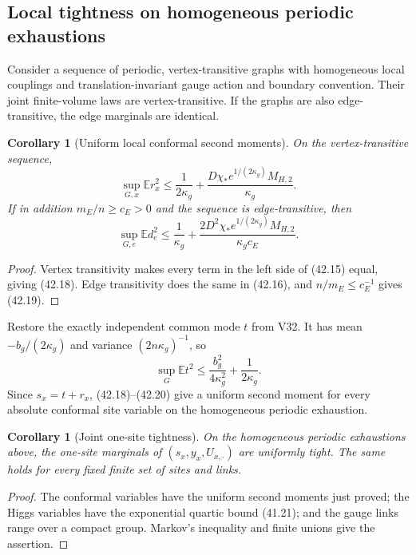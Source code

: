 \documentclass[11pt]{article}
\newtheorem{corollary}[theorem]{Corollary}
\theoremstyle{remark}
\begin{document}
\subsection{Local tightness on homogeneous periodic exhaustions}

Consider a sequence of periodic, vertex-transitive graphs with
homogeneous local couplings and translation-invariant gauge action and
boundary convention.  Their joint finite-volume laws are
vertex-transitive.  If the graphs are also edge-transitive, the edge
marginals are identical.

\begin{corollary}[Uniform local conformal second moments]
\label{cor:v17v42-local}
On the vertex-transitive sequence,
\[
 \sup_{G,x}\mathbb E r_x^2
 \leq\frac1{2\kappa_g}
 +\frac{D\chi_*e^{1/(2\kappa_g)}M_{H,2}}{\kappa_g}.              \tag{42.18}
\]
If in addition \(m_E/n\geq c_E>0\) and the sequence is edge-transitive,
then
\[
 \sup_{G,e}\mathbb E d_e^2
 \leq\frac1{\kappa_g}
 +\frac{2D^2\chi_*e^{1/(2\kappa_g)}M_{H,2}}
 {\kappa_gc_E}.                                   \tag{42.19}
\]
\end{corollary}

\begin{proof}
Vertex transitivity makes every term in the left side of (42.15)
equal, giving (42.18).  Edge transitivity does the same in (42.16), and
\(n/m_E\leq c_E^{-1}\) gives (42.19).
\end{proof}

Restore the exactly independent common mode \(t\) from V32.  It has
mean \(-b_g/(2\kappa_g)\) and variance
\((2n\kappa_g)^{-1}\), so
\[
 \sup_G\mathbb E t^2
 \leq\frac{b_g^2}{4\kappa_g^2}+\frac1{2\kappa_g}. \tag{42.20}
\]
Since \(s_x=t+r_x\), (42.18)--(42.20) give a uniform second moment for
every absolute conformal site variable on the homogeneous periodic
exhaustion.

\begin{corollary}[Joint one-site tightness]
\label{cor:v17v42-tight}
On the homogeneous periodic exhaustions above, the one-site marginals
of \((s_x,y_x,U_{x,\cdot})\) are uniformly tight.  The same holds for
every fixed finite set of sites and links.
\end{corollary}

\begin{proof}
The conformal variables have the uniform second moments just proved;
the Higgs variables have the exponential quartic bound (41.21); and the
gauge links range over a compact group.  Markov's inequality and finite
unions give the assertion.
\end{proof}
\end{document}
